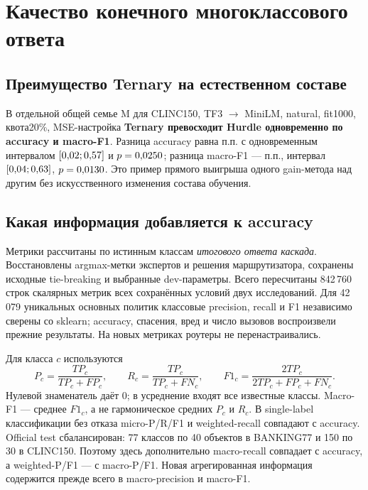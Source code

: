 \section{Качество конечного многоклассового ответа}
\label{sec:multiclass_extended}
\subsection{Преимущество Ternary на естественном составе}
В отдельной общей семье M для CLINC150, TF3 $\to$ MiniLM,
natural, fit1000, квота20\%, MSE-настройка
\textbf{Ternary превосходит Hurdle одновременно по accuracy и macro-F1}.
Разница accuracy равна \NaturalAccuracyEffect{} п.п. с одновременным
интервалом $[0{,}02; 0{,}57]$ и $p=0{,}0250$;
разница macro-F1 --- \NaturalFoneEffect{} п.п., интервал
$[0{,}04; 0{,}63]$, $p=0{,}0130$.
Это пример прямого выигрыша одного gain-метода над другим
без искусственного изменения состава обучения.

\begin{table}[htbp]\centering\small
\caption{CLINC150, TF3 $\to$ MiniLM, natural, MSE-настройка:
многоклассовые метрики, средние по 20 обучениям.
Статистически установлен контраст Ternary--Hurdle;
таблица остальных кандидатов показывает полный контекст сравнения.}
\label{tab:natural_multiclass}

\end{table}

\subsection{Какая информация добавляется к accuracy}
Метрики рассчитаны по истинным классам \emph{итогового ответа каскада}.
Восстановлены argmax-метки экспертов и решения маршрутизатора,
сохранены исходные tie-breaking и выбранные dev-параметры.
Всего пересчитаны 842\,760 строк скалярных метрик всех сохранённых
условий двух исследований. Для 42\,079 уникальных основных политик
классовые precision, recall и F1 независимо сверены со sklearn;
accuracy, спасения, вред и число вызовов воспроизвели прежние результаты.
На новых метриках роутеры не перенастраивались.

Для класса $c$ используются
\begin{equation}
P_c=\frac{TP_c}{TP_c+FP_c},\qquad
R_c=\frac{TP_c}{TP_c+FN_c},\qquad
F1_c=\frac{2TP_c}{2TP_c+FP_c+FN_c}.
\end{equation}
Нулевой знаменатель даёт 0; в усреднение входят все известные классы.
Macro-F1 --- среднее $F1_c$, а не гармоническое средних $P_c$ и $R_c$.
В single-label классификации без отказа micro-P/R/F1 и weighted-recall
совпадают с accuracy. Official test сбалансирован:
77 классов по 40 объектов в BANKING77 и 150 по 30 в CLINC150.
Поэтому здесь дополнительно macro-recall совпадает с accuracy,
а weighted-P/F1 --- с macro-P/F1. Новая агрегированная информация
содержится прежде всего в macro-precision и macro-F1.

